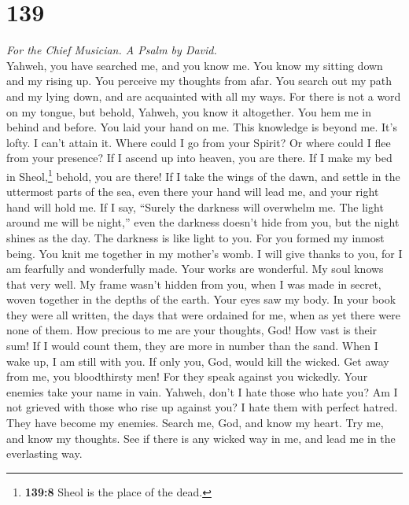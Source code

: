 \hypertarget{section-138}{%
\section{139}\label{section-138}}

\emph{For the Chief Musician. A Psalm by David.}\\
 Yahweh, you have searched me, and you know me.
 You know my sitting down and my rising up. You perceive
my thoughts from afar.  You search out my path and my
lying down, and are acquainted with all my ways.  For
there is not a word on my tongue, but behold, Yahweh, you know it
altogether.  You hem me in behind and before. You laid
your hand on me.  This knowledge is beyond me. It's lofty.
I can't attain it.  Where could I go from your Spirit? Or
where could I flee from your presence?  If I ascend up
into heaven, you are there. If I make my bed in Sheol,\footnote{\textbf{139:8}
  Sheol is the place of the dead.} behold, you are there! 
If I take the wings of the dawn, and settle in the uttermost parts of
the sea,  even there your hand will lead me, and your
right hand will hold me.  If I say, ``Surely the darkness
will overwhelm me. The light around me will be night,'' 
even the darkness doesn't hide from you, but the night shines as the
day. The darkness is like light to you.  For you formed
my inmost being. You knit me together in my mother's womb.
 I will give thanks to you, for I am fearfully and
wonderfully made. Your works are wonderful. My soul knows that very
well.  My frame wasn't hidden from you, when I was made
in secret, woven together in the depths of the earth. 
Your eyes saw my body. In your book they were all written, the days that
were ordained for me, when as yet there were none of them.
 How precious to me are your thoughts, God! How vast is
their sum!  If I would count them, they are more in
number than the sand. When I wake up, I am still with you.
 If only you, God, would kill the wicked. Get away from
me, you bloodthirsty men!  For they speak against you
wickedly. Your enemies take your name in vain.  Yahweh,
don't I hate those who hate you? Am I not grieved with those who rise up
against you?  I hate them with perfect hatred. They have
become my enemies.  Search me, God, and know my heart.
Try me, and know my thoughts.  See if there is any wicked
way in me, and lead me in the everlasting way.

